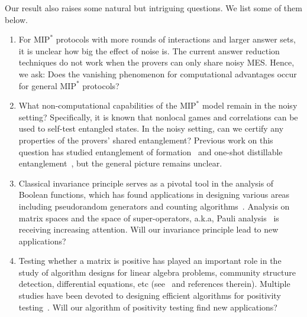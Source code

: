 \documentclass[11pt]{article}
\theoremstyle{plain}
\theoremstyle{definition}
\newcommand{\1}{\mathbb{1}} %
\newcommand{\MIP}{\mathrm{MIP}}
\begin{document}
Our result also raises some natural but intriguing questions. We list some of them below.
\begin{enumerate}
    \item For $\MIP^\ast$ protocols with more rounds of interactions and larger answer sets, it is unclear how big the effect of noise is. The current answer reduction techniques do not work when the provers can only share noisy MES. Hence, we ask: Does the vanishing phenomenon for computational advantages occur for general $\MIP^\ast$ protocols?
    \item What non-computational capabilities of the $\MIP^*$ model remain in the noisy setting? Specifically, it is known that nonlocal games and correlations can be used to self-test entangled states. In the noisy setting, can we certify any properties of the provers' shared entanglement? Previous work on this question has studied entanglement of formation~\cite{arnonFYen2018} and one-shot distillable entanglement~\cite{arnon2019device}, but the general picture remains unclear.

    \item Classical invariance principle serves as a pivotal tool in the analysis of Boolean functions, which has found applications in designing various areas including pseudorandom generators and counting algorithms~\cite{10.1145/2395116.2395118,10.1145/3460532,10.1145/3357713.3384281,10.1145/3519935.3519965,10.4230/LIPIcs.CCC.2022.21}. Analysis on matrix spaces and the space of super-operators, a.k.a, Pauli analysis~\cite{10.1145/3618260.3649662} is receiving increasing attention\cite{pmlr-v195-bao23b, doi:10.1137/1.9781611977554.ch43,arunachalam_et_al:LIPIcs.ICALP.2024.13,10.1145/3618260.3649662,Rouze2024,klein_et_al:LIPIcs.ITCS.2024.69,slote2024noncommutativebohnenblusthilleinequalityqudit}.  Will our invariance principle lead to new applications?

    \item Testing whether a matrix is positive has played an important role in the study of algorithm designs for linear algebra problems, community structure detection, differential equations, etc (see~\cite{bakshi2020testing} and references therein). Multiple studies have been devoted to designing efficient algorithms for positivity testing~\cite{9996743,han2017approximating,bakshi2020testing}. Will our algorithm of positivity testing find new applications?
\end{enumerate}
\end{document}
